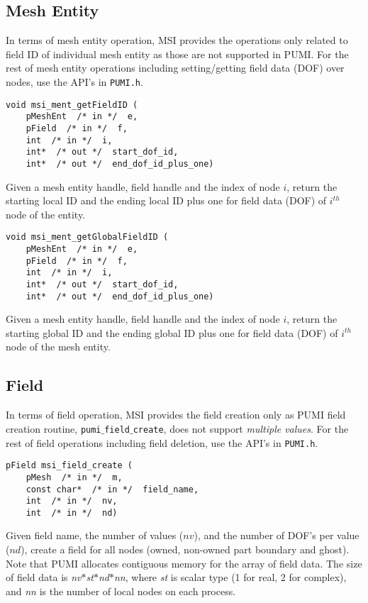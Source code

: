 \subsection{Mesh Entity}
In terms of mesh entity operation, MSI provides the operations only related to field ID of individual mesh entity as those are not supported in PUMI. For the rest of mesh entity operations including setting/getting field data (DOF) over nodes, use the API's in \texttt{PUMI.h}. 


\begin{verbatim}
void msi_ment_getFieldID (
    pMeshEnt  /* in */  e, 
    pField  /* in */  f, 
    int  /* in */  i,
    int*  /* out */  start_dof_id, 
    int*  /* out */  end_dof_id_plus_one)
\end{verbatim}\vspace{-.5cm}\hspace{1cm}
Given a mesh entity handle, field handle and the index of node $i$, return the starting local ID and the ending local ID plus one for field data (DOF) of $i^{th}$ node of the entity. 

\begin{verbatim}
void msi_ment_getGlobalFieldID (
    pMeshEnt  /* in */  e, 
    pField  /* in */  f, 
    int  /* in */  i,
    int*  /* out */  start_dof_id, 
    int*  /* out */  end_dof_id_plus_one)
\end{verbatim}\vspace{-.5cm}\hspace{1cm}
Given a mesh entity handle, field handle and the index of node $i$, return the starting global ID and the ending global ID plus one for field data (DOF) of $i^{th}$ node of the mesh entity. 

\subsection{Field}

In terms of field operation, MSI provides the field creation only as PUMI field creation routine, \texttt{pumi$\_$field$\_$create}, does not support \textit{multiple values}. For the rest of field operations including field deletion, use the API's in \texttt{PUMI.h}.

\begin{verbatim}
pField msi_field_create (
    pMesh  /* in */  m,
    const char*  /* in */  field_name, 
    int  /* in */  nv, 
    int  /* in */  nd)
\end{verbatim}\vspace{-.5cm}\hspace{1cm}
Given field name, the number of values ($nv$), and the number of DOF's per value ($nd$), create a field for all nodes (owned, non-owned part boundary and ghost). Note that PUMI allocates contiguous memory for the array of field data. The size of field data is \textit{nv}$*$\textit{st}$*$\textit{nd}$*$\textit{nn}, where \textit{st} is scalar type (1 for real, 2 for complex), and \textit{nn} is the number of local nodes on each process.


